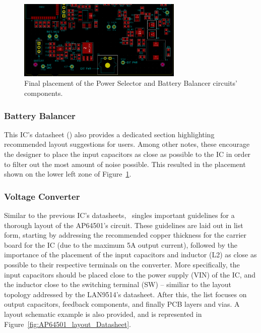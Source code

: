 \begin{figure}[h]
	\centering
	\includegraphics[width=0.7\textwidth]{Chapters/Figures/chapter5/placement_Power_Selector_and_BQ29209.png}
	\caption{Final placement of the Power Selector and Battery Balancer circuits' components.}
	\label{fig:placement_Power_Selector_and_BQ29209}
\end{figure}%


\subsubsection{Battery Balancer}\label{sec:5113_BQ29209}

This IC's datasheet (\cite{bq29209}) also provides a dedicated section highlighting recommended layout suggestions for users. Among other notes, these encourage the designer to place the input capacitors as close as possible to the IC in order to filter out the most amount of noise possible. This resulted in the placement shown on the lower left zone of Figure~\ref{fig:placement_Power_Selector_and_BQ29209}.


\subsubsection{Voltage Converter}\label{sec:5114_VoltageConverter}

Similar to the previous IC's datasheets,~\cite{AP64501} singles important guidelines for a thorough layout of the AP64501's circuit. These guidelines are laid out in list form, starting by addressing the recommended copper thickness for the carrier board for the IC (due to the maximum 5A output current), followed by the importance of the placement of the input capacitors and inductor (L2) as close as possible to their respective terminals on the converter. More specifically, the input capacitors should be placed close to the power supply (VIN) of the IC, and the inductor close to the switching terminal (SW) -- similiar to the layout topology addressed by the LAN9514's datasheet. After this, the list focuses on output capacitors, feedback components, and finally PCB layers and vias. A layout schematic example is also provided, and is represented in Figure~\ref{fig:AP64501_layout_Datasheet}.

